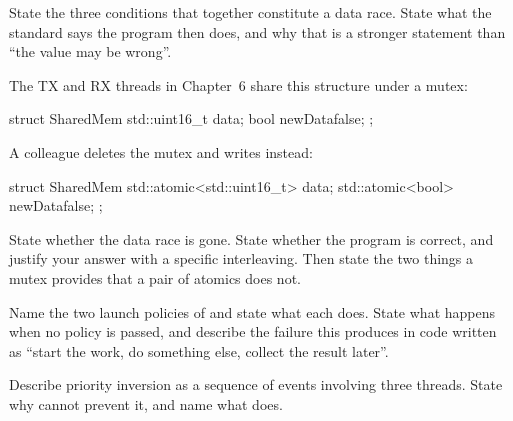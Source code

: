 \label{exb:q:8}

 State the three conditions that together constitute a data race. State what the standard
says the program then does, and why that is a stronger statement than ``the value may be wrong''.

 The TX and RX threads in Chapter~6 share this structure under a mutex:

\begin{cppcode}
struct SharedMem
{
    std::uint16_t data{};
    bool newData{false};
};
\end{cppcode}

\noindent A colleague deletes the mutex and writes instead:

\begin{cppcode}
struct SharedMem
{
    std::atomic<std::uint16_t> data{};
    std::atomic<bool> newData{false};
};
\end{cppcode}

\noindent State whether the data race is gone. State whether the program is correct, and justify
your answer with a specific interleaving. Then state the two things a mutex provides that a pair of
atomics does not. 

 Name the two launch policies of  and state what each does. State what
happens when no policy is passed, and describe the failure this produces in code written as ``start
the work, do something else, collect the result later''. 

 Describe priority inversion as a sequence of events involving three threads. State why
 cannot prevent it, and name what does. 
